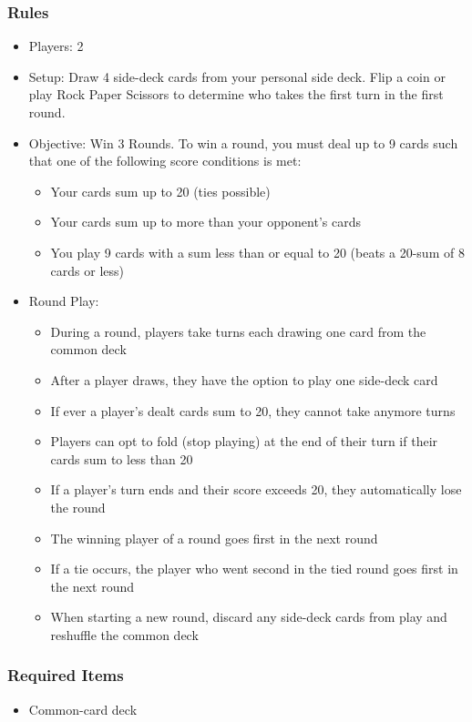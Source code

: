 \documentclass[12pt, landscape]{article}
\begin{document}
\begin{FlushLeft}
\begin{multicols}{2}
			\subsubsection{Rules}
			\begin{itemize}
				\item Players: 2
				\item Setup: Draw 4 side-deck cards from your personal side deck. Flip a coin or play Rock Paper Scissors to determine who takes the first turn in the first round.
				\item Objective: Win 3 Rounds. To win a round, you must deal up to 9 cards such that one of the following score conditions is met:
				\begin{itemize}
					\item Your cards sum up to 20 (ties possible)
					\item Your cards sum up to more than your opponent's cards
					\item You play 9 cards with a sum less than or equal to 20 (beats a 20-sum of 8 cards or less)
				\end{itemize}
				\item Round Play:
				\begin{itemize}
					\item During a round, players take turns each drawing one card from the common deck
					\item After a player draws, they have the option to play one side-deck card
					\item If ever a player's dealt cards sum to 20, they cannot take anymore turns
					\item Players can opt to fold (stop playing) at the end of their turn if their cards sum to less than 20
					\item If a player's turn ends and their score exceeds 20, they automatically lose the round
					\item The winning player of a round goes first in the next round
					\item If a tie occurs, the player who went second in the tied round goes first in the next round
					\item When starting a new round, discard any side-deck cards from play and reshuffle the common deck
				\end{itemize}
			\end{itemize}

			\subsubsection{Required Items}
			\begin{itemize}
				\item Common-card deck


\end{itemize}
\end{multicols}
\end{FlushLeft}
\end{document}
